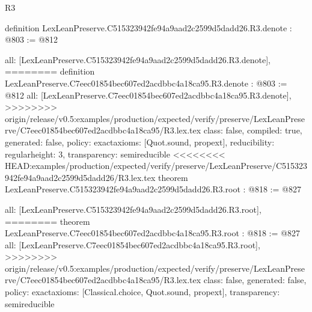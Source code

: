\begin{lexlean}{R3}
\begin{coremodule}
{{{{{{definition LexLeanPreserve.C515323942fe94a9aad2c2599d5dadd26.R3.denote : @803 := @812 {
  all: [LexLeanPreserve.C515323942fe94a9aad2c2599d5dadd26.R3.denote],
========
definition LexLeanPreserve.C7eec01854bec607ed2acdbbc4a18ca95.R3.denote : @803 := @812 {
  all: [LexLeanPreserve.C7eec01854bec607ed2acdbbc4a18ca95.R3.denote],
>>>>>>>> origin/release/v0.5:examples/production/expected/verify/preserve/LexLeanPreserve/C7eec01854bec607ed2acdbbc4a18ca95/R3.lex.tex
  class: false,
  compiled: true,
  generated: false,
  policy: exact{axioms: [Quot.sound, propext]},
  reducibility: regular{height: 3},
  transparency: semireducible
}
<<<<<<<< HEAD:examples/production/expected/verify/preserve/LexLeanPreserve/C515323942fe94a9aad2c2599d5dadd26/R3.lex.tex
theorem LexLeanPreserve.C515323942fe94a9aad2c2599d5dadd26.R3.root : @818 := @827 {
  all: [LexLeanPreserve.C515323942fe94a9aad2c2599d5dadd26.R3.root],
========
theorem LexLeanPreserve.C7eec01854bec607ed2acdbbc4a18ca95.R3.root : @818 := @827 {
  all: [LexLeanPreserve.C7eec01854bec607ed2acdbbc4a18ca95.R3.root],
>>>>>>>> origin/release/v0.5:examples/production/expected/verify/preserve/LexLeanPreserve/C7eec01854bec607ed2acdbbc4a18ca95/R3.lex.tex
  class: false,
  generated: false,
  policy: exact{axioms: [Classical.choice, Quot.sound, propext]},
  transparency: semireducible
}

}}}}}}}}
\end{coremodule}
\end{lexlean}
